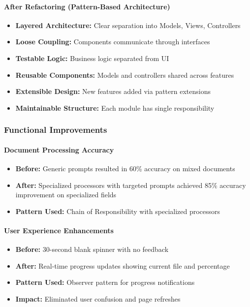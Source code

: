 \documentclass[11pt, a4paper]{article}
\theoremstyle{plain}
\theoremstyle{definition}
\begin{document}
\paragraph{After Refactoring (Pattern-Based Architecture)}
\begin{itemize}
    \item \textbf{Layered Architecture:} Clear separation into Models, Views, Controllers
    \item \textbf{Loose Coupling:} Components communicate through interfaces
    \item \textbf{Testable Logic:} Business logic separated from UI
    \item \textbf{Reusable Components:} Models and controllers shared across features
    \item \textbf{Extensible Design:} New features added via pattern extensions
    \item \textbf{Maintainable Structure:} Each module has single responsibility
\end{itemize}

\subsubsection{Functional Improvements}

\paragraph{Document Processing Accuracy}
\begin{itemize}
    \item \textbf{Before:} Generic prompts resulted in 60\% accuracy on mixed documents
    \item \textbf{After:} Specialized processors with targeted prompts achieved 85\% accuracy improvement on specialized fields
    \item \textbf{Pattern Used:} Chain of Responsibility with specialized processors
\end{itemize}

\paragraph{User Experience Enhancements}
\begin{itemize}
    \item \textbf{Before:} 30-second blank spinner with no feedback
    \item \textbf{After:} Real-time progress updates showing current file and percentage
    \item \textbf{Pattern Used:} Observer pattern for progress notifications
    \item \textbf{Impact:} Eliminated user confusion and page refreshes
\end{itemize}
\end{document}
